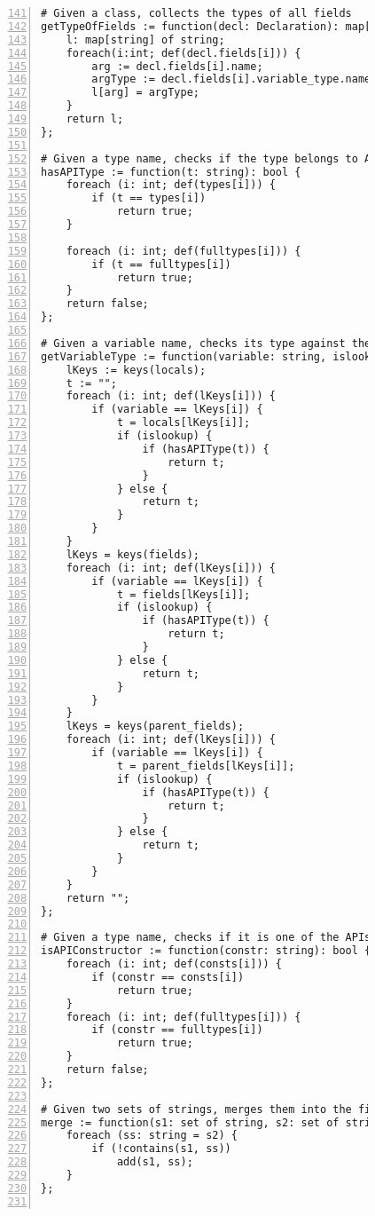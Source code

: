 \begin{figure}[ht!]
\begin{lstlisting}[numbers=left, tabsize=4, escapechar=@, caption={API Usage Mining Analysis},label={lst:aun-code},  firstline = 141, firstnumber = 141, lastline = 201]
# Given a class, collects the types of all fields
getTypeOfFields := function(decl: Declaration): map[string] of string {
    l: map[string] of string;
    foreach(i:int; def(decl.fields[i])) {
        arg := decl.fields[i].name;
        argType := decl.fields[i].variable_type.name;
        l[arg] = argType;
    }
    return l;
};

# Given a type name, checks if the type belongs to APIs of interest
hasAPIType := function(t: string): bool {
    foreach (i: int; def(types[i])) {
        if (t == types[i])
            return true;
    }
    
    foreach (i: int; def(fulltypes[i])) {
        if (t == fulltypes[i])
            return true;
    }
    return false;    
};

# Given a variable name, checks its type against the APIs of interest
getVariableType := function(variable: string, islookup: bool): string {
    lKeys := keys(locals);
    t := "";
    foreach (i: int; def(lKeys[i])) {
        if (variable == lKeys[i]) {
            t = locals[lKeys[i]];
            if (islookup) {
                if (hasAPIType(t)) {
                    return t;
                }
            } else {
                return t;
            }
        }
    }
    lKeys = keys(fields);
    foreach (i: int; def(lKeys[i])) {
        if (variable == lKeys[i]) {
            t = fields[lKeys[i]];
            if (islookup) {
                if (hasAPIType(t)) {
                    return t;
                }
            } else {
                return t;
            }
        }
    }
    lKeys = keys(parent_fields);
    foreach (i: int; def(lKeys[i])) {
        if (variable == lKeys[i]) {
            t = parent_fields[lKeys[i]];
            if (islookup) {
                if (hasAPIType(t)) {
                    return t;
                }
            } else {
                return t;
            }
        }
    }
    return "";
}; 

# Given a type name, checks if it is one of the APIs of interest
isAPIConstructor := function(constr: string): bool {
    foreach (i: int; def(consts[i])) {
        if (constr == consts[i])
            return true;
    }
    foreach (i: int; def(fulltypes[i])) {
        if (constr == fulltypes[i])
            return true;
    }
    return false;
};

# Given two sets of strings, merges them into the first set retaining only unique elements
merge := function(s1: set of string, s2: set of string) {
    foreach (ss: string = s2) {
        if (!contains(s1, ss))
            add(s1, ss);
    }
};


\end{lstlisting}
\end{figure}
